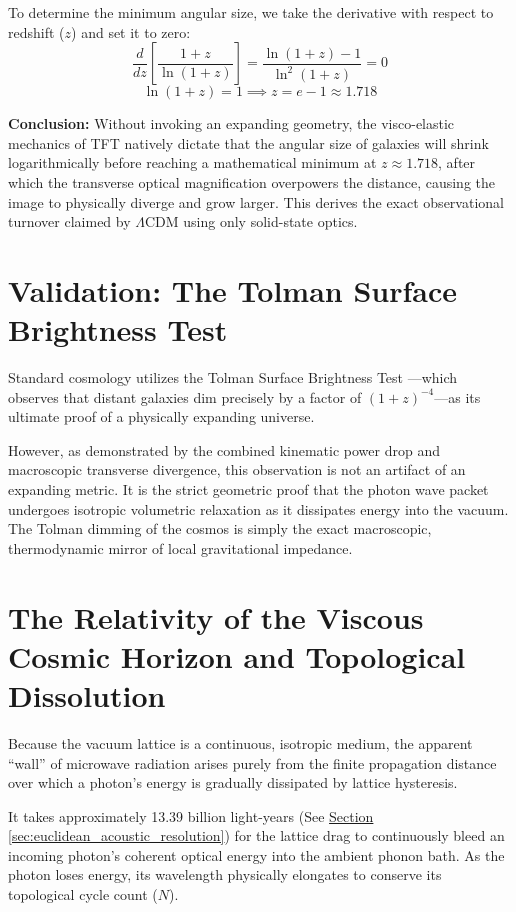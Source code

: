 To determine the minimum angular size, we take the derivative with respect to redshift ($z$) and set it to zero:
\[
\frac{d}{dz} \left[ \frac{1+z}{\ln(1+z)} \right] = \frac{\ln(1+z) - 1}{\ln^2(1+z)} = 0
\]
\[
\ln(1+z) = 1 \implies z = e - 1 \approx 1.718
\]

\textbf{Conclusion:} Without invoking an expanding geometry, the visco-elastic mechanics of TFT natively dictate that the angular size of galaxies will shrink logarithmically before reaching a mathematical minimum at $z \approx 1.718$, after which the transverse optical magnification overpowers the distance, causing the image to physically diverge and grow larger. This derives the exact observational turnover claimed by $\Lambda$CDM using only solid-state optics.

\section{Validation: The Tolman Surface Brightness Test}
Standard cosmology utilizes the Tolman Surface Brightness Test \cite{Tolman_1930}---which observes that distant galaxies dim precisely by a factor of $(1+z)^{-4}$---as its ultimate proof of a physically expanding universe.

However, as demonstrated by the combined kinematic power drop and macroscopic transverse divergence, this observation is not an artifact of an expanding metric. It is the strict geometric proof that the photon wave packet undergoes isotropic volumetric relaxation as it dissipates energy into the vacuum. The Tolman dimming of the cosmos is simply the exact macroscopic, thermodynamic mirror of local gravitational impedance.

\section{The Relativity of the Viscous Cosmic Horizon and Topological Dissolution}
Because the vacuum lattice is a continuous, isotropic medium, the apparent ``wall'' of microwave radiation arises purely from the finite propagation distance over which a photon's energy is gradually dissipated by lattice hysteresis.

It takes approximately 13.39 billion light-years (See \hyperref[sec:euclidean_acoustic_resolution]{Section \ref*{sec:euclidean_acoustic_resolution}}) for the lattice drag to continuously bleed an incoming photon's coherent optical energy into the ambient phonon bath. As the photon loses energy, its wavelength physically elongates to conserve its topological cycle count ($N$).

